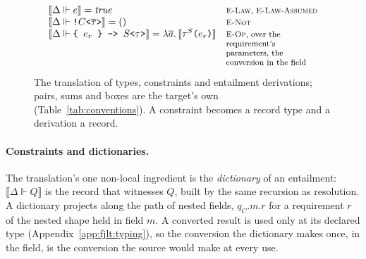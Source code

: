 \begin{figure}[htbp]
\[\begin{array}{@{}l@{\quad}l@{}}
\llbracket \Delta \Vdash e \rrbracket = \mathit{true} & \note{\textsc{E-Law}, \textsc{E-Law-Assumed}} \\
\llbracket \Delta \Vdash \texttt{!}C\texttt{<}\overline{\tau}\texttt{>} \rrbracket = () & \note{\textsc{E-Not}} \\
\llbracket \Delta \Vdash \texttt{\{ }e_r\texttt{ \} -> }S\texttt{<}\tau\texttt{>} \rrbracket = \lambda\overline{a}.\,\llbracket \tau^{S}\texttt{(}e_r\texttt{)} \rrbracket & \note{\textsc{E-Op}, over the requirement's parameters, the conversion in the field} \\[6pt]
\end{array}
\]
\caption{The translation of types, constraints and entailment derivations; pairs, sums and boxes are the target's own (Table~\ref{tab:conventions}).
A constraint becomes a record type and a derivation a record.}
\label{fig:fjlt-dictionaries}
\end{figure}

\paragraph{Constraints and dictionaries.}
The translation's one non-local ingredient is the \emph{dictionary} of an entailment: $\llbracket \Delta \Vdash Q \rrbracket$ is the record that witnesses $Q$, built by the same recursion as resolution.
A dictionary projects along the path of nested fields, $q_C.m.r$ for a requirement $r$ of the nested shape held in field $m$.
A converted result is used only at its declared type (Appendix~\ref{app:fjlt:typing}), so the conversion the dictionary makes once, in the field, is the conversion the source would make at every use.

